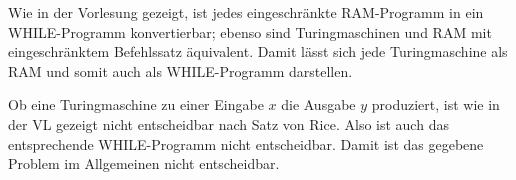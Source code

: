 Wie in der Vorlesung gezeigt, ist jedes eingeschränkte RAM-Programm in ein
WHILE-Programm konvertierbar; ebenso sind Turingmaschinen und RAM mit
eingeschränktem Befehlssatz äquivalent. Damit lässt sich jede Turingmaschine als
RAM und somit auch als WHILE-Programm darstellen.

Ob eine Turingmaschine zu einer Eingabe $x$ die Ausgabe $y$ produziert, ist
wie in der VL gezeigt nicht entscheidbar nach Satz von Rice. Also ist auch das
entsprechende WHILE-Programm nicht entscheidbar. Damit ist das gegebene Problem
im Allgemeinen nicht entscheidbar.
